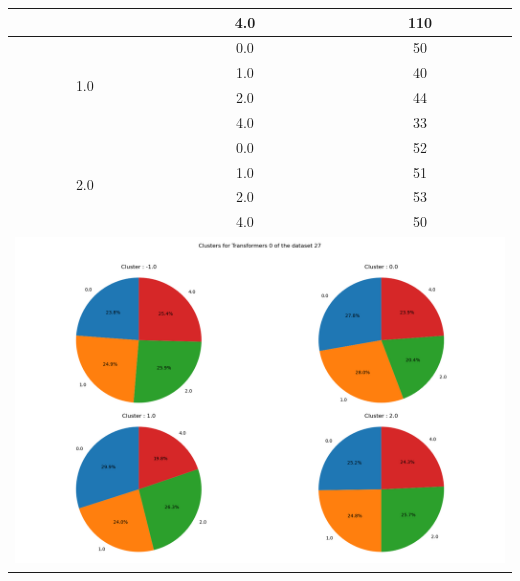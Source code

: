 \begin{longtable}{|c|c|c|c|c|}
& \multicolumn{2}{c|}{4.0} & \multicolumn{2}{c|}{110} \\
\hline
\multirow{4}{*}{1.0} & \multicolumn{2}{c|}{0.0} & \multicolumn{2}{c|}{50} \\
& \multicolumn{2}{c|}{1.0} & \multicolumn{2}{c|}{40} \\
& \multicolumn{2}{c|}{2.0} & \multicolumn{2}{c|}{44} \\
& \multicolumn{2}{c|}{4.0} & \multicolumn{2}{c|}{33} \\
\hline
\multirow{4}{*}{2.0} & \multicolumn{2}{c|}{0.0} & \multicolumn{2}{c|}{52} \\
& \multicolumn{2}{c|}{1.0} & \multicolumn{2}{c|}{51} \\
& \multicolumn{2}{c|}{2.0} & \multicolumn{2}{c|}{53} \\
& \multicolumn{2}{c|}{4.0} & \multicolumn{2}{c|}{50} \\
\hline
\multicolumn{5}{|c|}{\includegraphics[width=0.8\linewidth]{img/annexes/27/clustering_pie_charts/Transformers 0.png}} \\
\end{longtable}


